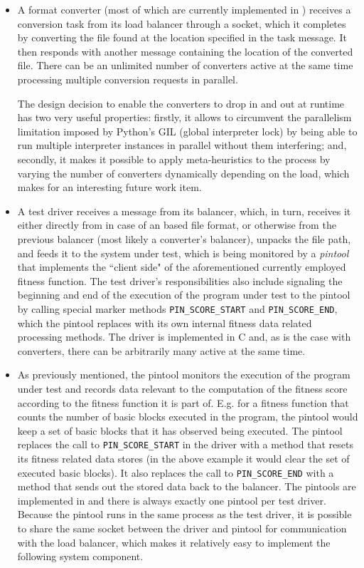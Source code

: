 \begin{itemize}
  \item A format converter (most of which are currently implemented in \python) receives a conversion task from
  its load balancer through a \zmq socket, which it completes by converting the file found at the location
  specified in the task message. It then responds with another message containing the location of the converted
  file. There can be an unlimited number of converters active at the same time processing multiple
  conversion requests in parallel. 
  
  The design decision to enable the converters to drop in and out at
  runtime has two very useful properties: firstly, it allows to circumvent the parallelism limitation
  imposed by {\small Python's} GIL (global interpreter lock) by being able to run multiple interpreter
  instances in parallel without them interfering; and, secondly, it makes it possible to apply meta-heuristics
  to the process by varying the number of converters dynamically depending on the load, which makes for an
  interesting future work item.
  
  \item A test driver receives a message from its balancer, which, in turn, receives it either directly from
  \xmlmate in case of an \xml based file format, or otherwise from the previous balancer (most likely a 
  converter's balancer), unpacks the file path, and feeds it to the system under test, which is being monitored
  by a \emph{pintool} that implements the ``client side" of the aforementioned currently employed fitness
  function. The test driver's responsibilities also include signaling the beginning and end of the execution of
  the program under test to the pintool by calling special marker methods \texttt{PIN\_SCORE\_START}
  and \texttt{PIN\_SCORE\_END}, which the pintool replaces with its own internal fitness data related
  processing methods. The driver is implemented in {\small C} and, as is the case with converters, there can
  be arbitrarily many active at the same time.
  
  \item As previously mentioned, the pintool monitors the execution of the program under test and records
  data relevant to the computation of the fitness score according to the fitness function it is part of.
  E.g. for a fitness function that counts the number of basic blocks executed in the program, the pintool 
  would keep a set of basic blocks that it has observed being executed. The pintool replaces the call to 
  \texttt{PIN\_SCORE\_START} in the driver with a method that resets its fitness related data stores (in the 
  above example it would clear the set of executed basic blocks). It also replaces the call to
  \texttt{PIN\_SCORE\_END} with a method that sends out the stored data back to the balancer. 
  The pintools are implemented in \cpp and there is always exactly one pintool per test driver.
  Because the pintool runs in the same process as the test driver, it is possible to share the same \zmq
  socket between the driver and pintool for communication with the load balancer, which makes it relatively
  easy to implement the following system component.
  

\end{itemize}
